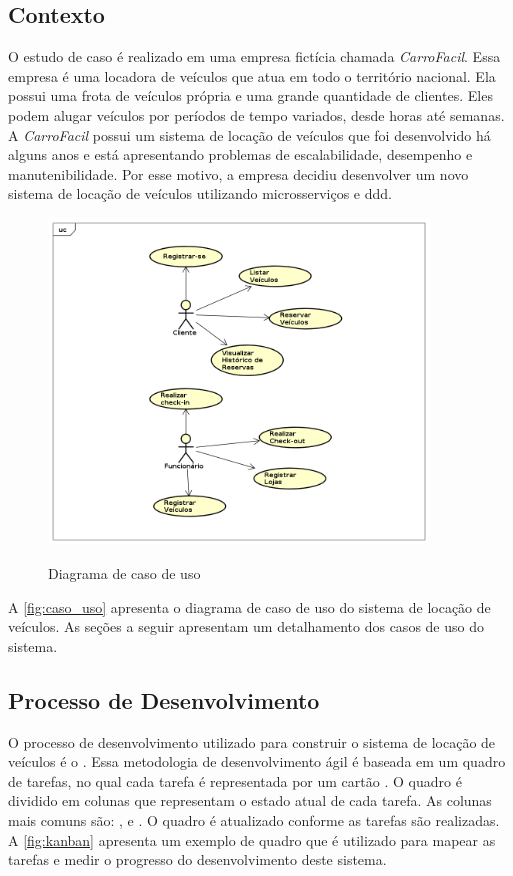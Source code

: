 \subsection{Contexto}
\label{section:contexto}
O estudo de caso é realizado em uma empresa fictícia chamada \emph{CarroFacil}. Essa empresa é uma locadora de veículos que atua em todo o território nacional. Ela possui uma frota de veículos própria e uma grande quantidade de clientes. Eles podem alugar veículos por períodos de tempo variados, desde horas até semanas. A \emph{CarroFacil} possui um sistema de locação de veículos que foi desenvolvido há alguns anos e está apresentando problemas de escalabilidade, desempenho e manutenibilidade. Por esse motivo, a empresa decidiu desenvolver um novo sistema de locação de veículos utilizando microsserviços e \acrshort{ddd}.

\begin{figure}[!h]
    \centering
    \caption{Diagrama de caso de uso}
    \includegraphics[width=0.9\textwidth]{media/diagrama_usecase.png}
    \label{fig:caso_uso}
\end{figure}

A \autoref{fig:caso_uso} apresenta o diagrama de caso de uso do sistema de locação de veículos. As seções a seguir apresentam um detalhamento dos casos de uso do sistema.

\subsection{Processo de Desenvolvimento}
\label{section:processo_desenvolvimento}
O processo de desenvolvimento utilizado para construir o sistema de locação de veículos é o . Essa metodologia de desenvolvimento ágil é baseada em um quadro de tarefas, no qual cada tarefa é representada por um cartão \cite{gomes2014agile}. O quadro é dividido em colunas que representam o estado atual de cada tarefa. As colunas mais comuns são: ,  e . O quadro é atualizado conforme as tarefas são realizadas. A \autoref{fig:kanban} apresenta um exemplo de quadro  que é utilizado para mapear as tarefas e medir o progresso do desenvolvimento deste sistema.

